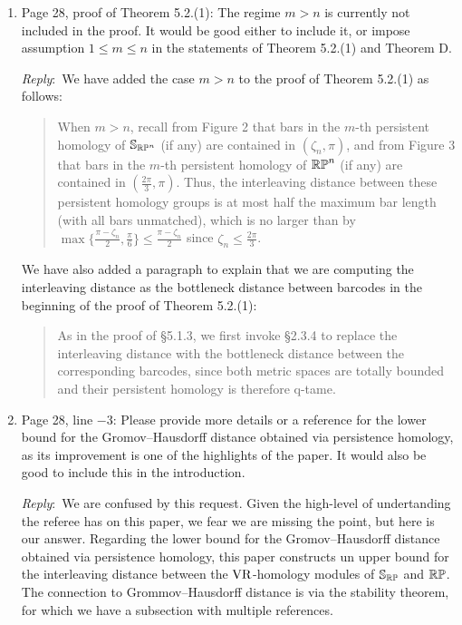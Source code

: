 \documentclass{amsart}
\newcommand{\ar}{\medskip\noindent\textit{Reply}:\ }
\begin{document}
\begin{enumerate}
		\item Page 28, proof of Theorem 5.2.(1): The regime $m > n$ is currently not included in the proof. It would be good either to include it, or impose assumption $1 \le m \le n$ in the statements of Theorem 5.2.(1) and Theorem D.

		\ar We have added the case $m > n$ to the proof of Theorem 5.2.(1) as follows:

		\smallskip

		\begin{quote}
			When $m > n$, recall from Figure 2 that bars in the $m$-th persistent homology of $\mathbb{S}_{\mathbb{RP}^n}$ (if any) are contained in $(\zeta_n, \pi)$, and from Figure 3 that bars in the $m$-th persistent homology of $\mathbb{RP}^n$ (if any) are contained in $(\tfrac{2\pi}{3}, \pi)$.
			Thus, the interleaving distance between these persistent homology groups is at most half the maximum bar length (with all bars unmatched), which is no larger than by $\max\{\tfrac{\pi - \zeta_n}{2}, \tfrac{\pi}{6}\} \leq \tfrac{\pi - \zeta_n}{2}$ since $\zeta_n \leq \tfrac{2\pi}{3}$.
		\end{quote}

		\smallskip

		We have also added a paragraph to explain that we are computing the interleaving distance as the bottleneck distance between barcodes in the beginning of the proof of Theorem 5.2.(1):

		\smallskip

		\begin{quote}
			As in the proof of \S5.1.3, we first invoke \S2.3.4 to replace the interleaving distance with the bottleneck distance between the corresponding barcodes, since both metric spaces are totally bounded and their persistent homology is therefore q-tame.
		\end{quote}

		\item Page 28, line $-3$: Please provide more details or a reference for the lower bound for the Gromov--Hausdorff distance obtained via persistence homology, as its improvement is one of the highlights of the paper. It would also be good to include this in the introduction.

		\ar We are confused by this request.
		Given the high-level of undertanding the referee has on this paper, we fear we are missing the point, but here is our answer.
		Regarding the lower bound for the Gromov--Hausdorff distance obtained via persistence homology, this paper constructs un upper bound for the interleaving distance between the \(\mathrm{VR}\)-homology modules of \(\mathbb{S}_{\mathbb{RP}}\) and \(\mathbb{RP}\).
		The connection to Grommov--Hausdorff distance is via the stability theorem, for which we have a subsection with multiple references.


\end{enumerate}
\end{document}
